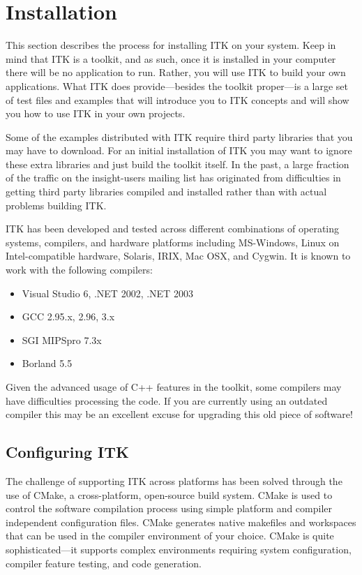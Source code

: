 \chapter{Installation}
\label{chapter:Installation}


This section describes the process for installing ITK on your system. Keep in
mind that ITK is a toolkit, and as such, once it is installed in your computer
there will be no application to run. Rather, you will use ITK to build your
own applications. What ITK does provide---besides the toolkit proper---is a
large set of test files and examples that will introduce you to ITK concepts
and will show you how to use ITK in your own projects.

Some of the examples distributed with ITK require third party libraries that
you may have to download. For an initial installation of ITK you may want to
ignore these extra libraries and just build the toolkit itself. In the past,
a large fraction of the traffic on the insight-users mailing list has
originated from
difficulties in getting third party libraries compiled and installed rather
than with actual problems building ITK.

ITK has been developed and tested across different combinations of
operating systems, compilers, and hardware platforms including
MS-Windows, Linux on Intel-compatible hardware, Solaris, IRIX, Mac
OSX, and Cygwin.  It is known to work with the following compilers:

\begin{itemize}
\item Visual Studio 6, .NET 2002, .NET 2003
\item GCC 2.95.x, 2.96, 3.x
\item SGI MIPSpro 7.3x
\item Borland 5.5
\end{itemize}

Given the advanced usage of C++ features in the toolkit, some
compilers may have difficulties processing the code. If you are
currently using an outdated compiler this may be an excellent excuse
for upgrading this old piece of software!

\section{Configuring ITK}
\label{sec:ConfiguringITK}

 
The challenge of supporting ITK across platforms has been solved through the
use of CMake, a cross-platform, open-source build system. CMake is used to
control the software compilation process using simple platform and compiler
independent configuration files.  CMake generates native makefiles and
workspaces that can be used in the compiler environment of your choice. CMake
is quite sophisticated---it supports complex environments requiring system
configuration, compiler feature testing, and code generation.

